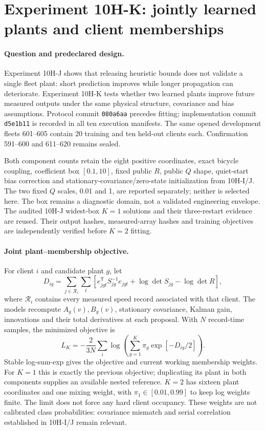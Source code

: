 \section{Experiment 10H-K: jointly learned plants and client memberships}
\label{sec:experiment10hk}

\paragraph{Question and predeclared design.}
Experiment 10H-J shows that releasing heuristic bounds does not validate a
single fleet plant: short prediction improves while longer propagation can
deteriorate. Experiment 10H-K tests whether two learned plants improve future
measured outputs under the same physical structure, covariance and bias
assumptions. Protocol commit \texttt{080a6aa} precedes fitting; implementation
commit \texttt{d5e1b11} is recorded in all ten execution manifests. The same
opened development fleets 601--605 contain 20 training and ten held-out
clients each. Confirmation 591--600 and 611--620 remains sealed.

Both component counts retain the eight positive coordinates, exact bicycle
coupling, coefficient box $[0.1,10]$, fixed public $R$, public $Q$ shape,
quiet-start bias correction and stationary-covariance/zero-state initialization
from 10H-I/J. The two fixed $Q$ scales, 0.01 and 1, are reported separately;
neither is selected here. The box remains a diagnostic domain, not a validated
engineering envelope. The audited 10H-J widest-box $K=1$ solutions and their
three-restart evidence are reused. Their output hashes, measured-array hashes
and training objectives are independently verified before $K=2$ fitting.

\paragraph{Joint plant--membership objective.}
For client $i$ and candidate plant $g$, let
\[
 D_{ig}=\sum_{j\in\mathcal R_i}\sum_t
 \left[e_{jgt}^{\mathsf T}S_{jg}^{-1}e_{jgt}
 +\log\det S_{jg}-\log\det R\right],
\]
where $\mathcal R_i$ contains every measured speed record associated with
that client. The models recompute $A_g(v),B_g(v)$, stationary covariance,
Kalman gain, innovations and their total derivatives at each proposal.
With $N$ record-time samples, the minimized objective is
\[
 L_K=-\frac{2}{3N}\sum_i\log\left(
    \sum_{g=1}^{K}\pi_g\exp[-D_{ig}/2]\right).
\]
Stable log-sum-exp gives the objective and current working membership weights.
For $K=1$ this is exactly the previous objective; duplicating its plant in
both components supplies an available nested reference. $K=2$ has sixteen
plant coordinates and one mixing weight, with $\pi_1\in[0.01,0.99]$ to keep
log weights finite. The limit does not force any hard client occupancy.
These weights are not calibrated class probabilities: covariance mismatch
and serial correlation established in 10H-I/J remain relevant.

